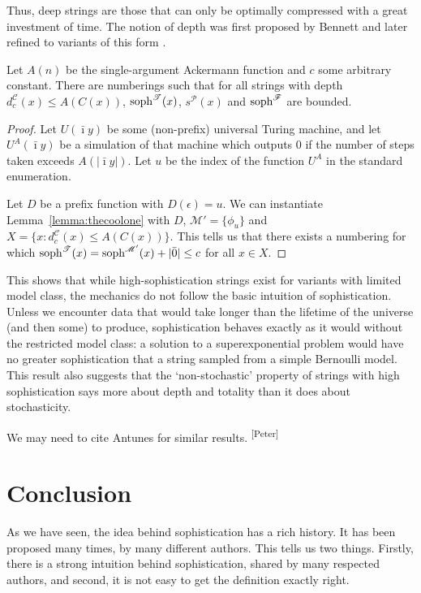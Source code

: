 \documentclass{style/llncs}
\newcommand{\M}{\mathscr M}
\newcommand{\C}{\mathscr C}
\newcommand{\T}{\mathscr T}
\newcommand{\F}{\mathscr F}
\renewcommand{\P}{\mathscr P}
\newcommand{\tn}[1]{\textnormal{#1}}
\newcommand{\s}{\tn{soph}}
\newcommand{\pb}[1]{\textcolor{OliveGreen}{\small #1 \textsuperscript{[Peter]} }}
\begin{document}
Thus, deep strings are those that can only be optimally compressed with a great investment of time. The notion of depth was first proposed by Bennett \cite{} and later refined to variants of this form \cite{}.

\begin{theorem}
Let $A(n)$ be the single-argument Ackermann function and $c$ some arbitrary constant. There are numberings such that for all strings with depth $d^\C_c(x) \leq A(C(x))$, $\s^\T(x)$, $s^\P(x)$ and $\s^\F$ are bounded.
\end{theorem}
\begin{proof}
Let $U(\bar\imath y)$ be some (non-prefix) universal Turing machine, and let $U^A(\bar\imath y)$ be a simulation of that machine which outputs $0$ if the number of steps taken exceeds $A(|\bar\imath y|)$. Let $u$ be the index of the function $U^A$ in the standard enumeration.

Let $D$ be a prefix function with $D(\epsilon) = u$. We can instantiate Lemma~\ref{lemma:thecoolone} with $D$, $\M' = \{\phi_u\}$ and $X = \{x : d^\C_c(x) \leq A(C(x))\}$. This tells us that there exists a numbering for which $\s^\T(x) = \s^{\M'}(x) + |\bar0| \leq c$ for all $x \in X$.
\end{proof}

This shows that while high-sophistication strings exist for variants with limited model class, the mechanics do not follow the basic intuition of sophistication. Unless we encounter data that would take longer than the lifetime of the universe (and then some) to produce, sophistication behaves exactly as it would without the restricted model class: a solution to a superexponential problem would have no greater sophistication that a string sampled from a simple Bernoulli model. This result also suggests that the `non-stochastic' property of strings with high sophistication\cite{shen1983concept,vereshchagin2004kolmogorov} says more about depth and totality than it does about stochasticity.

\pb{We may need to cite Antunes for similar results.}  

\section{Conclusion}

As we have seen, the idea behind sophistication has a rich history. It has been proposed many times, by many different authors. This tells us two things. Firstly, there is a strong intuition behind sophistication, shared by many respected authors, and second, it is not easy to get the definition exactly right.
\end{document}
